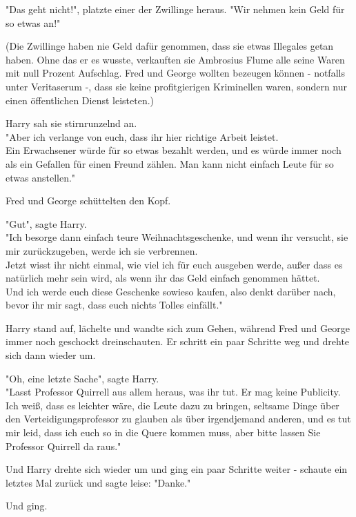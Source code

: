 {"Das geht nicht!", platzte einer der Zwillinge heraus. "Wir nehmen kein Geld für so etwas an!"

(Die Zwillinge haben nie Geld dafür genommen, dass sie etwas Illegales getan haben. Ohne das er es wusste, verkauften sie Ambrosius Flume alle seine Waren mit null Prozent Aufschlag. Fred und George wollten bezeugen können - notfalls unter Veritaserum -, dass sie keine profitgierigen Kriminellen waren, sondern nur einen öffentlichen Dienst leisteten.)

Harry sah sie stirnrunzelnd an.\\ "Aber ich verlange von euch, dass ihr hier richtige Arbeit leistet.\\ Ein Erwachsener würde für so etwas bezahlt werden, und es würde immer noch als ein Gefallen für einen Freund zählen. Man kann nicht einfach Leute für so etwas anstellen."

Fred und George schüttelten den Kopf.

"Gut", sagte Harry.\\ "Ich besorge dann einfach teure Weihnachtsgeschenke, und wenn ihr versucht, sie mir zurückzugeben, werde ich sie verbrennen.\\ Jetzt wisst ihr nicht einmal, wie viel ich für euch ausgeben werde, außer dass es natürlich mehr sein wird, als wenn ihr das Geld einfach genommen hättet.\\ Und ich werde euch diese Geschenke sowieso kaufen, also denkt darüber nach, bevor ihr mir sagt, dass euch nichts Tolles einfällt."

Harry stand auf, lächelte und wandte sich zum Gehen, während Fred und George immer noch geschockt dreinschauten. Er schritt ein paar Schritte weg und drehte sich dann wieder um.

"Oh, eine letzte Sache", sagte Harry.\\ "Lasst Professor Quirrell aus allem heraus, was ihr tut. Er mag keine Publicity. Ich weiß, dass es leichter wäre, die Leute dazu zu bringen, seltsame Dinge über den Verteidigungsprofessor zu glauben als über irgendjemand anderen, und es tut mir leid, dass ich euch so in die Quere kommen muss, aber bitte lassen Sie Professor Quirrell da raus."

Und Harry drehte sich wieder um und ging ein paar Schritte weiter - schaute ein letztes Mal zurück und sagte leise: "Danke."

Und ging.

}
